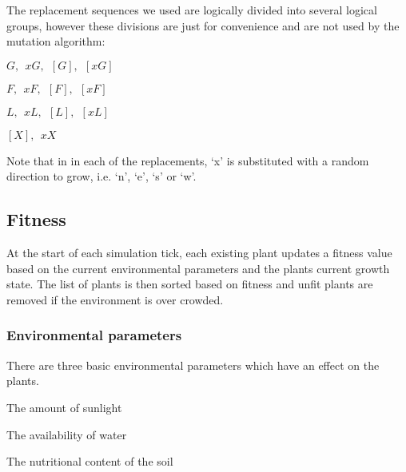 \documentclass[conference]{acmsiggraph}
\begin{document}
The replacement sequences we used are logically divided into several logical
groups, however these divisions are just for convenience and are not used by the
mutation algorithm:

\begin{description}[leftmargin=!,labelindent=0.2in,labelwidth=0.5in]
  \item[Stems]   $G,~~xG,~~[G],~~[xG]$
  \item[Flowers] $F,~~xF,~~[F],~~[xF]$
  \item[Leaves]  $L,~~xL,~~[L],~~[xL]$
  \item[Other]   $[X],~~xX$
\end{description}

Note that in in each of the replacements, `x' is substituted with a random
direction to grow, i.e. `n', `e', `s' or `w'.

\subsection{Fitness}

% 
% 

At the start of each simulation tick, each existing plant updates a fitness
value based on the current environmental parameters and the plants current
growth state. The list of plants is then sorted based on fitness and unfit
plants are removed if the environment is over crowded.

\subsubsection{Environmental parameters}

There are three basic environmental parameters which have an effect on the
plants.

\begin{description}[leftmargin=!,labelindent=0.2in,labelwidth=0.5in]
  \item[sun]       The amount of sunlight
  \item[water]     The availability of water
  \item[nutrition] The nutritional content of the soil
\end{description}
\end{document}

